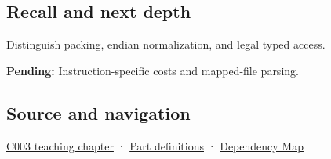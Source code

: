 \subsection{Recall and next depth}\label{appendix-0682dbfc5f0e-recall-and-next-depth}

Distinguish packing, endian normalization, and legal typed access.

\textbf{Pending:} Instruction-specific costs and mapped-file parsing.

\subsection{Source and navigation}\label{appendix-0682dbfc5f0e-source-and-navigation}

\hyperref[01-foundations-i-ch002-where-the-bytes-live]{C003 teaching chapter} · \hyperref[appendix-fd090d982a15-m003---parts-41-60]{Part definitions} · \hyperref[appendix-4ad47bdd269a]{Dependency Map}
